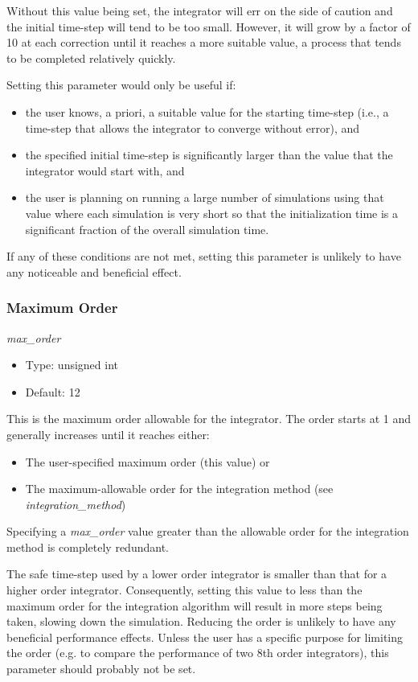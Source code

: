 Without this value being set, the integrator will err on the side of
caution and the initial time-step will tend to be too
small.  However, it will grow by a factor of 10 at each correction until
it reaches
a more suitable value, a process that tends to be completed relatively
quickly.

Setting this parameter would only be useful if:
\begin{itemize}
\item
the user knows, a priori, a suitable value for the starting time-step (i.e.,
a time-step that allows the integrator to converge without error), and
\item
the specified initial time-step is significantly larger than the value
that the integrator would start with, and
\item
the user is planning on running a large number of simulations using
that value where each simulation is very short so that the initialization
time is a significant fraction of the overall simulation time.
\end{itemize}

If any of these conditions are not met, setting this parameter is unlikely
to have any noticeable and beneficial effect.


\subsubsection{Maximum Order}
\textit{max\_order}

\begin{itemize}
\item
Type: unsigned int
\item
Default: 12
\end{itemize}

This is the maximum order allowable for the integrator.  The order starts at
1 and generally increases until it reaches either:
\begin{itemize}
\item The user-specified maximum order (this value) or
\item The maximum-allowable order for the integration method (see 
\textit{integration\_method})
\end{itemize}
Specifying a \textit{max\_order} value greater than the allowable order for
the integration method is completely
redundant.

The safe time-step used by a lower order integrator is smaller than that
for a higher order integrator.  Consequently,  setting this value to less
than the maximum order for the integration algorithm will result in more
steps being taken, slowing down the simulation.  Reducing the order is
unlikely to have any beneficial performance effects.  Unless the user
has a specific purpose for limiting the order (e.g. to compare the performance
of two 8th order integrators), this parameter should probably not be set.


